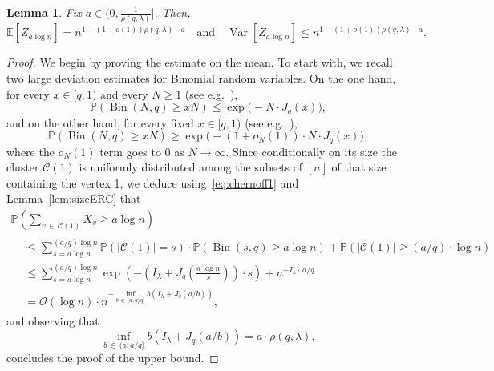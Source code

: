 \documentclass[10pt]{amsart}
\newtheorem{lemm}[theo]{Lemma}\newtheorem{prop}[theo]{Proposition}\newtheorem{coro}[theo]{Corollary}\newtheorem{conj}[theo]{Conjecture}
\theoremstyle{definition}\newtheorem{defi}[theo]{Definition}\newtheorem{rema}[theo]{Remark}\newtheorem{exam}[theo]{Example}\newtheorem{exem}[theo]{Example}\newtheorem{nota}[theo]{Notation}
\renewcommand{\Pr}{\mathbb{P}}
\newcommand{\bbE}{\mathbb{E}}
\newcommand{\cO}{\mathcal{O}}
\newcommand{\cC}{\mathcal{C}}
\DeclareMathOperator{\rVar}{Var}
\DeclareMathOperator{\rBin}{Bin}
\begin{document}
\begin{lemm}\label{lem:inter.giant.sub}
Fix $a\in (0,\tfrac{1}{\rho(q,\lambda)}]$. Then,
\[
\bbE\left[\widetilde Z_{a\log n}\right] = n^{1-(1+o(1)) \rho(q,\lambda)\,\cdot\, a } \quad \text{and}\quad \rVar\left[\widetilde Z_{a\log n}\right] \le n^{1-(1+o(1)) \rho(q,\lambda)\,\cdot\, a}.
\]
\end{lemm}
\begin{proof}
We begin by proving the estimate on the mean. To start with, we recall two large deviation estimates for Binomial random variables. On the one hand, for every $x\in [q,1)$ and every $N\ge 1$ (see e.g.~\cite[Corollary~2.20]{Hof16}),
\begin{equation}\label{eq:chernoff1}
\Pr(\rBin(N,q)\ge xN) \le \exp\big(- N \cdot J_q(x)\big),
\end{equation}
and on the other hand, for every fixed $x\in [q,1)$ (see e.g.~\cite[Theorem~2.2.3 and Exercise~2.2.23]{DZ09}),
\begin{equation}\label{eq:chernoff2}
\Pr(\rBin(N,q)\ge xN) \ge \exp\big(-(1+o_N(1))\cdot N \cdot J_q(x)\big),
\end{equation}
where the $o_N(1)$ term goes to $0$ as $N\to \infty$. Since conditionally on its size the cluster $\cC(1)$ is uniformly distributed among the subsets of $[n]$ of that size containing the vertex 1, we deduce using~\eqref{eq:chernoff1} and Lemma~\ref{lem:sizeERC} that
\begin{multline}\label{eq:X_v}
\Pr\left(\sum_{v\,\in\,\cC(1)} X_v\ge a\log n\right)\\
\begin{aligned}
& \le
\sum_{s=a\log n}^{(a/q) \log n} \Pr(|\cC(1)|=s) \cdot \Pr(\rBin(s,q)\ge a\log n)+ \Pr(|\cC(1)|\ge (a/q)\cdot \log n) \\
&\le
\sum_{s=a\log n}^{(a/q)\log n} \exp\left(-\left(I_\lambda +J_q\left(\frac{a\log n}{s}\right)\right) \cdot s\right)+ n^{-I_\lambda \cdot\, a/q} \\
&=
\cO(\log n)\cdot n^{- \inf_{b\,\in\,(a,a/q]} b(I_\lambda + J_q(a/b))},
\end{aligned}
\end{multline}
and observing that
\begin{equation}\label{eq:infb}
\inf_{b\,\in\,(a,a/q]} b\left(I_\lambda + J_q(a/b)\right) = a\cdot \rho(q,\lambda),
\end{equation}
concludes the proof of the upper bound.


\end{proof}
\end{document}

